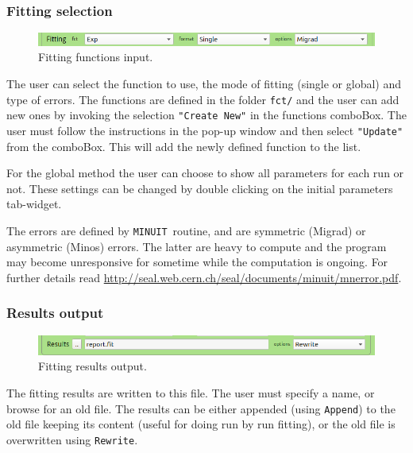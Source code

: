 \documentclass[10pt,letterpaper,oneside]{article}
\newcommand{\minuit}{\texttt{MINUIT}}
\begin{document}
\subsubsection*{Fitting selection}
\begin{figure}[h]
\includegraphics[width=\textwidth]{analyze-fct.png}
 \caption{Fitting functions input.}
 \label{fig-mag}
 \end{figure}

The user can select the function to use, the mode of fitting (single or global) and type of errors. The functions are defined in the folder \verb+fct/+ and the user can add new ones by invoking the selection \verb+"Create New"+ in the functions comboBox. The user must follow the instructions in the pop-up window and then select \verb+"Update"+ from the comboBox. This will add the newly defined function to the list. 

For the global method the user can choose to show all parameters for each run or not. These settings can be changed by double clicking on the initial parameters tab-widget. 

The errors are defined by \minuit\ routine, and are symmetric (Migrad) or asymmetric (Minos) errors. The latter are heavy to compute and the program may become unresponsive for sometime while the computation is ongoing. For further details read \url{http://seal.web.cern.ch/seal/documents/minuit/mnerror.pdf}.


\subsubsection*{Results output}
\begin{figure}[!htb]
\includegraphics[width=\textwidth]{analyze-res.png}
 \caption{Fitting results output.}
 \label{fig-mag}
 \end{figure}
The fitting results are written to this file. The user must specify a name, or browse for an old file. The results can be either appended
 (using \verb+Append+) to the old file keeping its content (useful for doing run by run fitting), or the old file is overwritten using \verb+Rewrite+.
\end{document}

